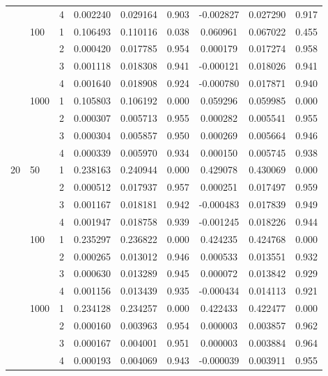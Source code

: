\begin{tabular}{lll|ccc|ccc}
   &      & 4 &  0.002240 &  0.029164 &                 0.903 &-0.002827 &  0.027290 &                 0.917 \\
   & 100  & 1 &  0.106493 &  0.110116 &                 0.038 & 0.060961 &  0.067022 &                 0.455 \\
   &      & 2 &  0.000420 &  0.017785 &                 0.954 & 0.000179 &  0.017274 &                 0.958 \\
   &      & 3 &  0.001118 &  0.018308 &                 0.941 &-0.000121 &  0.018026 &                 0.941 \\
   &      & 4 &  0.001640 &  0.018908 &                 0.924 &-0.000780 &  0.017871 &                 0.940 \\
   & 1000 & 1 &  0.105803 &  0.106192 &                 0.000 & 0.059296 &  0.059985 &                 0.000 \\
   &      & 2 &  0.000307 &  0.005713 &                 0.955 & 0.000282 &  0.005541 &                 0.955 \\
   &      & 3 &  0.000304 &  0.005857 &                 0.950 & 0.000269 &  0.005664 &                 0.946 \\
   &      & 4 &  0.000339 &  0.005970 &                 0.934 & 0.000150 &  0.005745 &                 0.938 \\
20 & 50   & 1 &  0.238163 &  0.240944 &                 0.000 & 0.429078 &  0.430069 &                 0.000 \\
   &      & 2 &  0.000512 &  0.017937 &                 0.957 & 0.000251 &  0.017497 &                 0.959 \\
   &      & 3 &  0.001167 &  0.018181 &                 0.942 &-0.000483 &  0.017839 &                 0.949 \\
   &      & 4 &  0.001947 &  0.018758 &                 0.939 &-0.001245 &  0.018226 &                 0.944 \\
   & 100  & 1 &  0.235297 &  0.236822 &                 0.000 & 0.424235 &  0.424768 &                 0.000 \\
   &      & 2 &  0.000265 &  0.013012 &                 0.946 & 0.000533 &  0.013551 &                 0.932 \\
   &      & 3 &  0.000630 &  0.013289 &                 0.945 & 0.000072 &  0.013842 &                 0.929 \\
   &      & 4 &  0.001156 &  0.013439 &                 0.935 &-0.000434 &  0.014113 &                 0.921 \\
   & 1000 & 1 &  0.234128 &  0.234257 &                 0.000 & 0.422433 &  0.422477 &                 0.000 \\
   &      & 2 &  0.000160 &  0.003963 &                 0.954 & 0.000003 &  0.003857 &                 0.962 \\
   &      & 3 &  0.000167 &  0.004001 &                 0.951 & 0.000003 &  0.003884 &                 0.964 \\
   &      & 4 &  0.000193 &  0.004069 &                 0.943 &-0.000039 &  0.003911 &                 0.955 \\
\bottomrule
\end{tabular}
